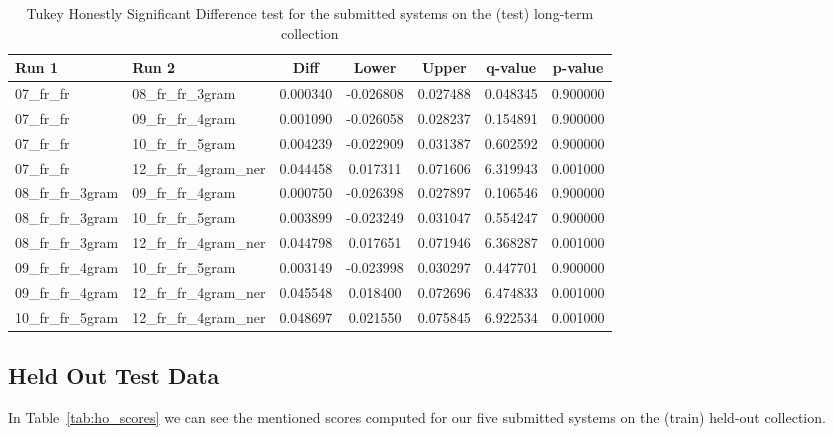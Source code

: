 \begin{table}[h!]
    \centering
    \caption{Tukey Honestly Significant Difference test for the submitted systems on the (test) long-term collection}
    \label{tab:lt_comparison}
    \begin{tabular}{|l|l||c|c|c|c|c|}
        \hline
        \textbf{Run 1} & \textbf{Run 2} & \textbf{Diff} & \textbf{Lower} & \textbf{Upper} & \textbf{q-value} & \textbf{p-value} \\ \hline\hline
        07\_fr\_fr & 08\_fr\_fr\_3gram & 0.000340 & -0.026808 & 0.027488 & 0.048345 & 0.900000 \\ \hline
        07\_fr\_fr & 09\_fr\_fr\_4gram & 0.001090 & -0.026058 & 0.028237 & 0.154891 & 0.900000 \\ \hline
        07\_fr\_fr & 10\_fr\_fr\_5gram & 0.004239 & -0.022909 & 0.031387 & 0.602592 & 0.900000 \\ \hline
        07\_fr\_fr & 12\_fr\_fr\_4gram\_ner & 0.044458 & 0.017311 & 0.071606 & 6.319943 & 0.001000 \\ \hline
        08\_fr\_fr\_3gram & 09\_fr\_fr\_4gram & 0.000750 & -0.026398 & 0.027897 & 0.106546 & 0.900000 \\ \hline
        08\_fr\_fr\_3gram & 10\_fr\_fr\_5gram & 0.003899 & -0.023249 & 0.031047 & 0.554247 & 0.900000 \\ \hline
        08\_fr\_fr\_3gram & 12\_fr\_fr\_4gram\_ner & 0.044798 & 0.017651 & 0.071946 & 6.368287 & 0.001000 \\ \hline
        09\_fr\_fr\_4gram & 10\_fr\_fr\_5gram & 0.003149 & -0.023998 & 0.030297 & 0.447701 & 0.900000 \\ \hline
        09\_fr\_fr\_4gram & 12\_fr\_fr\_4gram\_ner & 0.045548 & 0.018400 & 0.072696 & 6.474833 & 0.001000 \\ \hline
        10\_fr\_fr\_5gram & 12\_fr\_fr\_4gram\_ner & 0.048697 & 0.021550 & 0.075845 & 6.922534 & 0.001000 \\ \hline
    \end{tabular}
\end{table}

\subsection{Held Out Test Data}\label{subsec:held_out}

In Table~\ref{tab:ho_scores} we can see the mentioned scores computed for our five submitted systems on the (train)
held-out collection.\\


